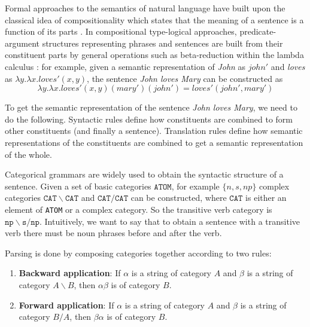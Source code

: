 Formal approaches to the semantics of natural language have built upon the
classical idea of compositionality which states that the meaning of a sentence is a
function of its parts \cite{Janssen2001}. In compositional type-logical
approaches, predicate-argument structures representing phrases and sentences are
built from their constituent parts by general operations such as beta-reduction
within the lambda calculus \cite{THEO:THEO373}: for example, given a semantic
representation of \emph{John} as $\mathit{john}'$ and \emph{loves} as
$\lambda y.\lambda x.\mathit{loves}'(x, y)$, the sentence \emph{John loves Mary}
can be constructed as
$$
\lambda y.\lambda
x.\mathit{loves}'(x, y)(\mathit{mary}')(\mathit{john}') =
\mathit{loves}'(\mathit{john}', \mathit{mary}')
$$

To get the semantic representation of the sentence \textit{John loves Mary}, we
need to do the following. Syntactic rules define how constituents are combined
%
%
%
to form other constituents (and finally a sentence). Translation rules define
how semantic representations of the constituents are combined to get a semantic
representation of the whole.

Categorical grammars are widely used to obtain the syntactic structure of a sentence. Given a set of basic categories $\texttt{ATOM}$, for example $\{\mathit{n}, \mathit{s}, \mathit{np}\}$ complex categories
%
%
%
$\mathtt{CAT} \backslash \mathtt{CAT}$ and $\mathtt{CAT}/\mathtt{CAT}$ can be constructed, where $\mathtt{CAT}$ is either an element of \texttt{\texttt{ATOM}} or a complex category. So the transitive verb category is $\mathtt{np}\backslash\mathtt{s}/\mathtt{np}$. Intuitively, we want to say that to obtain a sentence with a transitive verb there must be noun phrases before and after the verb.

Parsing is done by composing categories together according to two rules:
%
\begin{enumerate}
\item \textbf{Backward application}: If $\alpha$ is a string of category $A$ and
  $\beta$ is a string of category $A\backslash{}B$, then $\alpha\beta$ is of
  category $B$.
\item \textbf{Forward application}: If $\alpha$ is a string of category $A$ and
  $\beta$ is a string of category $B/A$, then $\beta\alpha$ is of category $B$.
\end{enumerate}

